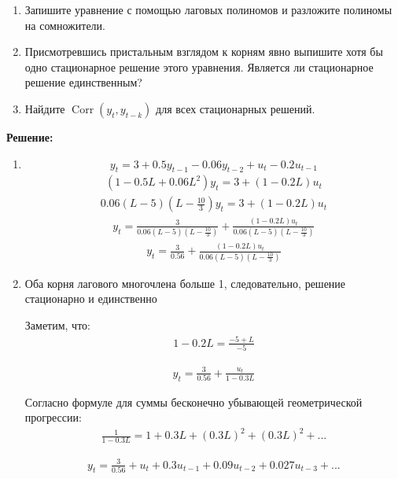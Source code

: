 \documentclass[a4paper,14pt]{article}
\DeclareMathOperator{\Corr}{Corr}
\begin{document}
\begin{enumerate}
\begin{enumerate}
	\item Запишите уравнение с помощью лаговых полиномов и разложите полиномы на сомножители. 
	\item Присмотревшись пристальным взглядом к корням явно выпишите хотя бы одно стационарное решение этого уравнения. 
	Является ли стационарное решение единственным?
	\item Найдите $\Corr(y_t, y_{t-k})$ для всех стационарных решений. 
\end{enumerate}

{\bf Решение:}

\begin{enumerate}
	\item $$y_t = 3 + 0.5 y_{t-1} - 0.06 y_{t-2} + u_t - 0.2 u_{t-1}$$
     \[\begin{aligned}
(1-0.5L+0.06L^2)y_t = 3 + (1-0.2L)u_t
	\end{aligned}\]
      \[\begin{aligned}
0.06(L-5)(L-\frac{10}{3})y_t = 3 + (1-0.2L)u_t
	\end{aligned}\]
       \[\begin{aligned}
y_t = \frac{3}{0.06(L-5)(L-\frac{10}{3})} + \frac{(1-0.2L)u_t}{ 0.06(L-5)(L-\frac{10}{3})} 
	\end{aligned}\]
       \[\begin{aligned}
y_t = \frac{3}{0.56} + \frac{(1-0.2L)u_t}{ 0.06(L-5)(L-\frac{10}{3})} 
	\end{aligned}\]



 
	\item Оба корня лагового многочлена больше 1, следовательно, решение стационарно и единственно

 Заметим, что:
       \[\begin{aligned}
1-0.2L =  \frac{-5 + L}{-5} 
	\end{aligned}\]

        \[\begin{aligned}
y_t = \frac{3}{0.56} + \frac{u_t}{1-0.3L} 
	\end{aligned}\]

 Согласно формуле для суммы бесконечно убывающей геометрической прогрессии:
         \[\begin{aligned}
\frac{1}{1-0.3L}  = 1 + 0.3L + (0.3L)^2 + (0.3L)^2 + ...
	\end{aligned}\]

         \[\begin{aligned}
y_t = \frac{3}{0.56} + u_t + 0.3u_{t-1} + 0.09u_{t-2} + 0.027u_{t-3} + ...
	\end{aligned}\]
 

\end{enumerate}
\end{enumerate}
\end{document}
